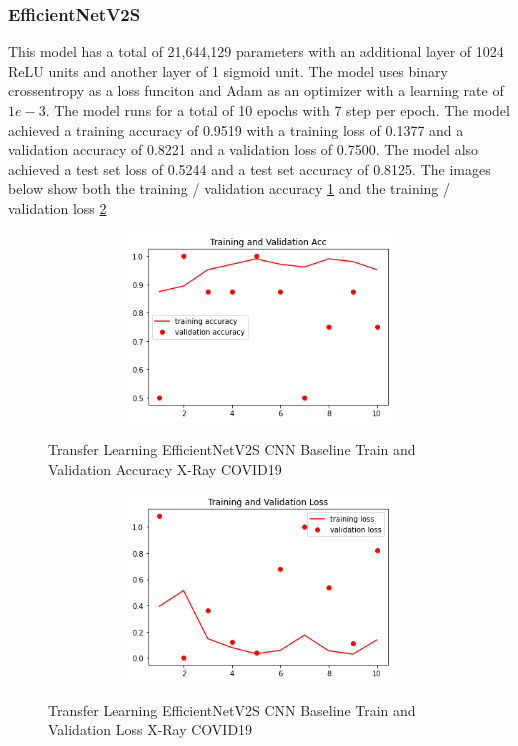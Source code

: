 \subsubsection{EfficientNetV2S}
This model has a total of 21,644,129 parameters with an additional layer of 1024 ReLU units and another layer of 1 sigmoid unit.  The model uses binary crossentropy as a loss funciton and Adam as an optimizer with a learning rate of $1e-3$.  The model runs for a total of 10 epochs with 7 step per epoch. The model achieved a training accuracy of 0.9519 with a training loss of 0.1377 and a validation accuracy of 0.8221 and a validation loss of 0.7500.  The model also achieved a test set loss of 0.5244 and a test set accuracy of 0.8125. The images below show both the training / validation accuracy \ref{fig:EfficientNetV2S CNN Baseline Train and Validation Accuracy X-Ray COVID19} and the training / validation loss \ref{fig:EfficientNetV2S CNN Baseline Train and Validation Loss X-Ray COVID19}
 \begin{figure}[H]
    \centering
    \includegraphics[width=1\textwidth,height=5cm,keepaspectratio]{Images/EfficientNetV2SBaselineTrainingValidationAccuracyXRayCOVID19.png}\\
    \caption{Transfer Learning EfficientNetV2S CNN Baseline Train and Validation Accuracy X-Ray COVID19}
    \label{fig:EfficientNetV2S CNN Baseline Train and Validation Accuracy X-Ray COVID19}
\end{figure}
 \begin{figure}[H]
    \centering
    \includegraphics[width=1\textwidth,height=5cm,keepaspectratio]{Images/EfficientNetV2SBaselineTrainingValidationLossXRayCOVID19.png}\\
    \caption{Transfer Learning EfficientNetV2S CNN Baseline Train and Validation Loss X-Ray COVID19}
    \label{fig:EfficientNetV2S CNN Baseline Train and Validation Loss X-Ray COVID19}
\end{figure}
